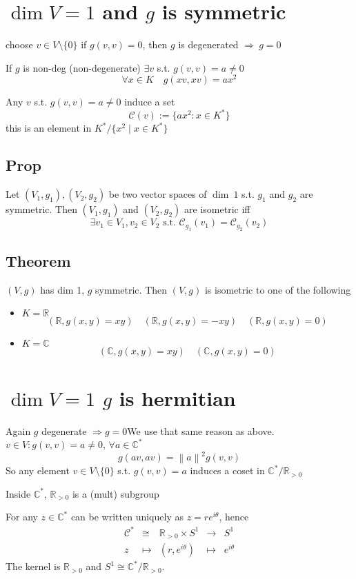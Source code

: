 \documentclass{book}
\newcommand{\norm}[1]{\left\lVert #1 \right\rVert}
\begin{document}
\section{$\dim V=1$ and $g$ is symmetric}
choose $v\in V\setminus\{0\}$ if $g(v,v)=0$, then $g$ is degenerated $\Rightarrow\ g=0$

If $g$ is non-deg (non-degenerate) $\exists v$ s.t. $g(v,v)=a\neq0$$$\forall x\in K\quad g(xv,xv)=ax^2$$

Any $v$ s.t. $g(v,v)=a\neq0$ induce a set
$$\mathcal{C}(v):=\{ax^2:x\in K^*\}$$ this is an element in $K^*/\{x^2\mid x\in K^*\}$
\subsection{Prop}Let $(V_1,g_1),(V_2,g_2)$ be two vector spaces of $\dim\ 1$ s.t. $g_1$ and $g_2$ are symmetric. Then $(V_1,g_1)$ and $(V_2,g_2)$ are isometric iff
$$\exists v_1\in V_1,v_2\in V_2\text{ s.t. }\mathcal{C}_{g_1}(v_1)=\mathcal{C}_{g_2}(v_2)$$
\subsection{Theorem}
$(V,g)$ has dim 1, $g$ symmetric. Then $(V,g)$ is isometric to one of the following
\begin{itemize}
    \item $K=\mathbb{R}$$$(\mathbb{R},g(x,y)=xy)\quad(\mathbb{R},g(x,y)=-xy)\quad (\mathbb{R},g(x,y)=0)$$
    \item $K=\mathbb{C}$$$(\mathbb{C},g(x,y)=xy)\quad (\mathbb{C},g(x,y)=0)$$ 
\end{itemize}
\section{$\dim V=1$ $g$ is hermitian}
Again $g$ degenerate $\Rightarrow g=0$We use that same reason as above. $v\in V:g(v,v)=a\neq 0$, $\forall a\in \mathbb{C}^*$$$g(av,av)=\norm{a}^2g(v,v)$$
So any element $v\in V\setminus\{0\}$ s.t. $g(v,v)=a$ induces a coset in $\mathbb{C}^*/\mathbb{R}_{> 0}$

Inside $\mathbb{C}^*$, $\mathbb{R}_{>0}$ is a (mult) subgroup

For any $z\in \mathbb{C}^*$ can be written uniquely as $z=re^{i\theta}$, hence
$$\begin{aligned}
    \mathcal{C}^* &\cong&\mathbb{R}_{>0}\times S^1&\rightarrow& S^1\\
    z& \mapsto&(r,e^{i\theta}) &\mapsto& e^{i\theta} 
\end{aligned}$$
The kernel is $\mathbb{R}_{>0}$ and $S^1\cong\mathbb{C}^*/\mathbb{R}_{>0}$.
\end{document}
